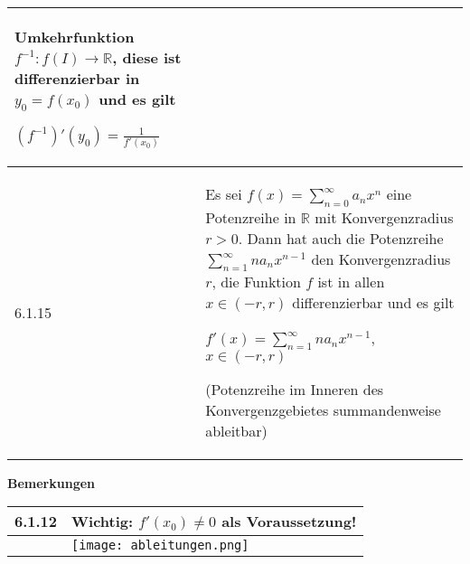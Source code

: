 \begin{table}[H]
\begin{tabularx}{\textwidth}{X m{16cm}}
                \textbf{Umkehrfunktion} $f^{-1}: f(I) \rightarrow \mathbb{R}$, diese ist differenzierbar in $y_0 = f(x_0)$ und es gilt \hfill \break
                \centerline{$(f^{-1})'(y_0) = \frac{1}{f'(x_0)} $} \\
        \midrule
        6.1.15& Es sei $f(x) = \sum^{\infty}_{n=0} a_n  x^n$ eine Potenzreihe in $\mathbb{R}$ mit Konvergenzradius $r >0$. Dann hat
                auch die Potenzreihe $\sum^{\infty}_{n=1} na_nx^{n-1}$ den Konvergenzradius $r$, die Funktion $f$ ist in allen
                $x \in (-r,r)$ differenzierbar und es gilt \hfill \break
                \centerline{$f'(x) = \sum^{\infty}_{n=1} na_n x^{n-1}$, $x \in (-r,r)$}
                (Potenzreihe im Inneren des Konvergenzgebietes summandenweise ableitbar)\\

        \bottomrule
    \end{tabularx}
    \end{table}

    \noindent
    \textbf{Bemerkungen}
    \begin{table}[H]
    \begin{tabularx}{\textwidth}{X m{16cm}}
        \toprule

        6.1.12& Wichtig: $f'(x_0) \neq 0$ als Voraussetzung! \\
        \midrule
              & \texttt{[image: ableitungen.png]} \\
        \bottomrule
    \end{tabularx}
    \end{table}


